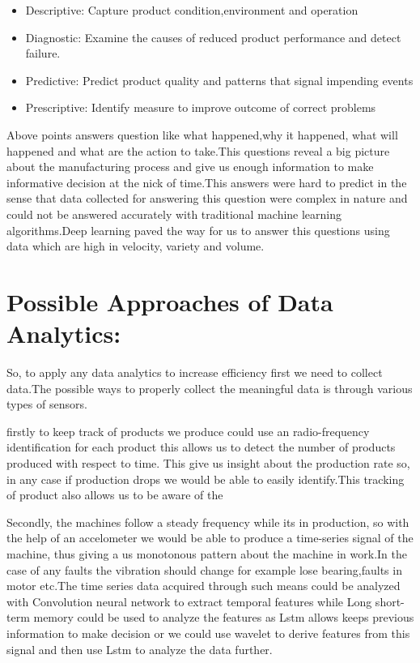 \documentclass{article}
\begin{document}
\begin{normalsize}
\begin{itemize}
\item{Descriptive: Capture product condition,environment and operation}
\item{Diagnostic: Examine the causes of reduced product performance and detect failure. 
} 
\item{Predictive: Predict product quality and patterns that signal impending events}
\item{Prescriptive: Identify measure to improve outcome of correct problems}
	\end{itemize}
		Above points answers question like what happened,why it happened, what will happened and what are the action to take.This questions reveal a big picture about the manufacturing process and give us enough information to make informative decision at the nick of time.This answers were hard to predict in the sense that data collected for answering this question were complex in nature and could not be answered accurately with traditional machine learning algorithms.Deep learning paved the way for us to answer this questions using data which are high in velocity, variety and volume.
      \section{Possible Approaches of Data Analytics:}  
      So, to apply any data analytics  to increase efficiency first we need to collect data.The possible ways to properly collect the meaningful data is through various types of sensors.
      
      firstly to keep track of products we produce could use an radio-frequency identification for each product this allows us to detect the number of products produced with respect to time. This give us insight about the production rate so, in any case if production drops we would be able to easily identify.This tracking of product also allows us to be aware of the 
      
      Secondly, the machines follow a steady frequency while its in production, so with the help of an accelometer we would be able to produce a time-series signal of the machine, thus giving a us monotonous pattern about the machine in work.In the case of any faults the vibration should change for example lose bearing,faults in motor etc.The time series data acquired through such means could be analyzed with Convolution neural network to extract temporal features while  Long short-term memory could be used to analyze the features as Lstm allows keeps previous information to make decision or we could use wavelet to derive features from this signal and then use Lstm to analyze the data further.
      

\end{normalsize}
\end{document}
